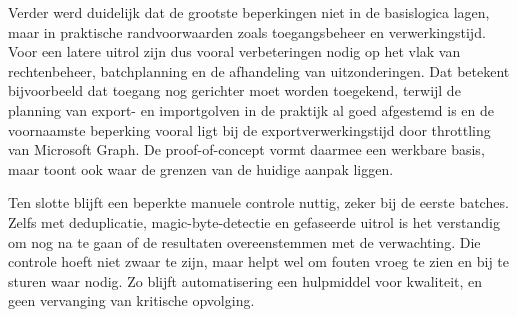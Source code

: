 Verder werd duidelijk dat de grootste beperkingen niet in de basislogica lagen, maar in praktische randvoorwaarden zoals toegangsbeheer en verwerkingstijd. Voor een latere uitrol zijn dus vooral verbeteringen nodig op het vlak van rechtenbeheer, batchplanning en de afhandeling van uitzonderingen. Dat betekent bijvoorbeeld dat toegang nog gerichter moet worden toegekend, terwijl de planning van export- en importgolven in de praktijk al goed afgestemd is en de voornaamste beperking vooral ligt bij de exportverwerkingstijd door throttling van Microsoft Graph. De proof-of-concept vormt daarmee een werkbare basis, maar toont ook waar de grenzen van de huidige aanpak liggen.

Ten slotte blijft een beperkte manuele controle nuttig, zeker bij de eerste batches. Zelfs met deduplicatie, magic-byte-detectie en gefaseerde uitrol is het verstandig om nog na te gaan of de resultaten overeenstemmen met de verwachting. Die controle hoeft niet zwaar te zijn, maar helpt wel om fouten vroeg te zien en bij te sturen waar nodig. Zo blijft automatisering een hulpmiddel voor kwaliteit, en geen vervanging van kritische opvolging.

